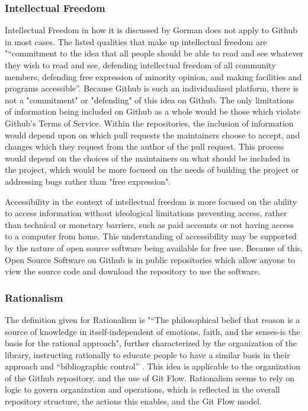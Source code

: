 \subsubsection{Intellectual Freedom}

Intellectual Freedom in how it is discussed by Gorman does not apply to Github in most cases. The listed qualities that make up intellectual freedom are "“commitment to the idea that all people should be able to read and see whatever they wish to read and see, defending intellectual freedom of all community members, defending free expression of minority opinion, and making facilities and programs accessible”\cite{gorman2000values}. Because Github is such an individualized platform, there is not a "commitment" or "defending" of this idea on Github. The only limitations of information being included on Github as a whole would be those which violate Github's Terms of Service. Within the repositories, the inclusion of information would depend upon on which pull requests the maintainers choose to accept, and changes which they request from the author of the pull request. This process would depend on the choices of the maintainers on what should be included in the project, which would be more focused on the needs of building the project or addressing bugs rather than "free expression". 

Accessibility in the context of intellectual freedom is more focused on the ability to access information without ideological limitations preventing access, rather than technical or monetary barriers, such as paid accounts or not having access to a computer from home. This understanding of accessibility may be supported by the nature of open source software being available for free use. Because of this, Open Source Software on Github is in public repositories which allow anyone to view the source code and download the repository to use the software. 

\subsubsection{Rationalism}

The definition given for Rationalism is "“The philosophical belief that reason is a source of knowledge in itself-independent of emotions, faith, and the senses-is the basis for the rational approach", further characterized by the organization of the library, instructing rationally to educate people to have a similar basis in their approach and “bibliographic control” \cite{gorman2000values}. This idea is applicable to the organization of the Github repository, and the use of Git Flow. Rationalism seems to rely on logic to govern organization and operations, which is reflected in the overall repository structure, the actions this enables, and the Git Flow model. 

